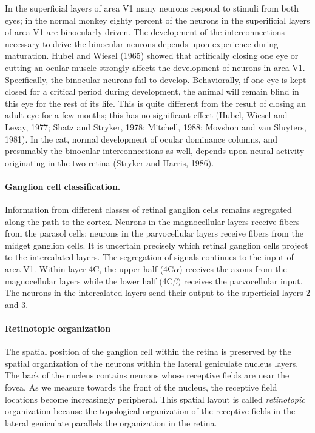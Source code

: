 In the superficial layers of area V1 many neurons
respond to stimuli from both eyes;
in the normal monkey eighty percent of the neurons in 
the superificial layers of area V1 are binocularly driven.
The development of the interconnections necessary to
drive the binocular neurons
depends upon experience during maturation.
Hubel and Wiesel (1965) showed that
artifically closing one eye or cutting an ocular muscle
strongly affects the development
of neurons in area V1.
Specifically, the binocular neurons fail to develop.
Behaviorally, if one eye is kept closed for a
critical period during development, 
the animal will remain blind in this eye for the rest of its life.
This is quite different from the result
of closing an adult eye for a few months;
this has no significant effect
(Hubel, Wiesel and Levay, 1977;
Shatz and Stryker, 1978;
Mitchell, 1988; 
Movshon and van Sluyters, 1981).
In the cat, normal development of ocular dominance columns,
and presumably the binocular interconnections as well,
depends upon neural activity originating in the two
retina (Stryker and Harris, 1986).

\paragraph{Ganglion cell classification.  }
Information from different classes of retinal ganglion cells
remains segregated along the path to the cortex.
Neurons in the magnocellular layers receive fibers
from the parasol cells;
neurons in the parvocellular layers
receive fibers from the midget ganglion cells.
It is uncertain precisely which retinal ganglion cells project
to the intercalated layers.
The segregation of signals continues to
the input of area V1.
Within layer 4C, the upper half (4C$\alpha$) receives the
axons from  the magnocellular layers while the
lower half (4C$\beta)$ receives the parvocellular input.
The neurons in the intercalated layers send their output
to the superficial layers 2 and 3.

\paragraph{Retinotopic organization}
The spatial position of the ganglion cell within the retina is
preserved by the spatial organization of the neurons within the
lateral geniculate nucleus layers.  
The back of the nucleus contains
neurons whose receptive fields are near the fovea.  As we measure
towards the front of the nucleus, the receptive field
locations become increasingly peripheral.  
This spatial layout is called {\em retinotopic} organization
because the topological organization of the
receptive fields in the lateral geniculate parallels the
organization in the retina.

